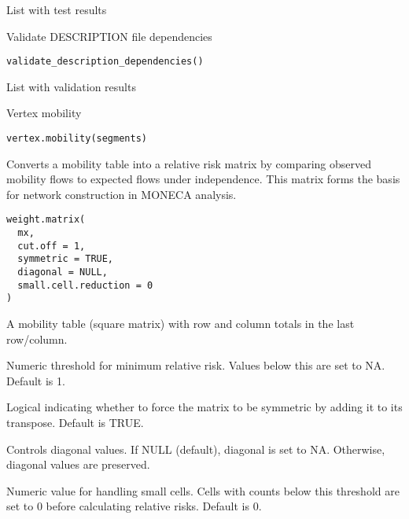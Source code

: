 \documentclass[a4paper]{book}
\begin{document}
%
\begin{Value}
List with test results
\end{Value}
%
\begin{Description}
Validate DESCRIPTION file dependencies
\end{Description}
%
\begin{Usage}
\begin{verbatim}
validate_description_dependencies()
\end{verbatim}
\end{Usage}
%
\begin{Value}
List with validation results
\end{Value}
%
\begin{Description}
Vertex mobility
\end{Description}
%
\begin{Usage}
\begin{verbatim}
vertex.mobility(segments)
\end{verbatim}
\end{Usage}
%
\begin{Description}
Converts a mobility table into a relative risk matrix by comparing observed
mobility flows to expected flows under independence. This matrix forms the
basis for network construction in MONECA analysis.
\end{Description}
%
\begin{Usage}
\begin{verbatim}
weight.matrix(
  mx,
  cut.off = 1,
  symmetric = TRUE,
  diagonal = NULL,
  small.cell.reduction = 0
)
\end{verbatim}
\end{Usage}
%
\begin{Arguments}
\begin{ldescription}
\item[\code{mx}] A mobility table (square matrix) with row and column totals in the 
last row/column.

\item[\code{cut.off}] Numeric threshold for minimum relative risk. Values below this
are set to NA. Default is 1.

\item[\code{symmetric}] Logical indicating whether to force the matrix to be symmetric
by adding it to its transpose. Default is TRUE.

\item[\code{diagonal}] Controls diagonal values. If NULL (default), diagonal is set 
to NA. Otherwise, diagonal values are preserved.

\item[\code{small.cell.reduction}] Numeric value for handling small cells. Cells with
counts below this threshold are set to 0 before calculating relative risks.
Default is 0.
\end{ldescription}
\end{Arguments}
\end{document}
